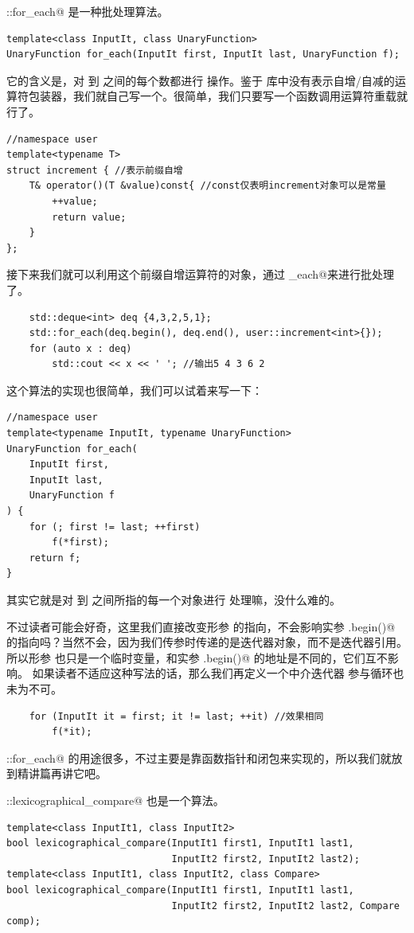 \lstinline@std::for_each@ 是一种批处理算法。
\begin{lstlisting}
template<class InputIt, class UnaryFunction>
UnaryFunction for_each(InputIt first, InputIt last, UnaryFunction f);
\end{lstlisting}
它的含义是，对 \lstinline@first@ 到 \lstinline@last@ 之间的每个数都进行 \lstinline@f@ 操作。鉴于 \lstinline@functional@ 库中没有表示自增/自减的运算符包装器，我们就自己写一个。很简单，我们只要写一个函数调用运算符重载就行了。
\begin{lstlisting}
//namespace user
template<typename T>
struct increment { //表示前缀自增
    T& operator()(T &value)const{ //const仅表明increment对象可以是常量
        ++value;
        return value;
    }
};
\end{lstlisting}
接下来我们就可以利用这个前缀自增运算符的对象，通过 \lstinline@for_each@来进行批处理了。
\begin{lstlisting}
    std::deque<int> deq {4,3,2,5,1};
    std::for_each(deq.begin(), deq.end(), user::increment<int>{});
    for (auto x : deq)
        std::cout << x << ' '; //输出5 4 3 6 2
\end{lstlisting}\par
这个算法的实现也很简单，我们可以试着来写一下：
\begin{lstlisting}
//namespace user
template<typename InputIt, typename UnaryFunction>
UnaryFunction for_each(
    InputIt first,
    InputIt last,
    UnaryFunction f
) {
    for (; first != last; ++first)
        f(*first);
    return f;
}
\end{lstlisting}
其实它就是对 \lstinline@first@ 到 \lstinline@last@ 之间所指的每一个对象进行 \lstinline@f@ 处理嘛，没什么难的。\par
不过读者可能会好奇，这里我们直接改变形参 \lstinline@first@ 的指向，不会影响实参 \lstinline@deq.begin()@ 的指向吗？当然不会，因为我们传参时传递的是迭代器对象，而不是迭代器引用。所以形参 \lstinline@first@ 也只是一个临时变量，和实参 \lstinline@deq.begin()@ 的地址是不同的，它们互不影响。
如果读者不适应这种写法的话，那么我们再定义一个中介迭代器 \lstinline@it@ 参与循环也未为不可。
\begin{lstlisting}
    for (InputIt it = first; it != last; ++it) //效果相同
        f(*it);
\end{lstlisting}
\lstinline@std::for_each@ 的用途很多，不过主要是靠函数指针和闭包来实现的，所以我们就放到精讲篇再讲它吧。\par
\lstinline@std::lexicographical_compare@ 也是一个算法。
\begin{lstlisting}
template<class InputIt1, class InputIt2>
bool lexicographical_compare(InputIt1 first1, InputIt1 last1,
                             InputIt2 first2, InputIt2 last2);
template<class InputIt1, class InputIt2, class Compare>
bool lexicographical_compare(InputIt1 first1, InputIt1 last1,
                             InputIt2 first2, InputIt2 last2, Compare comp);
\end{lstlisting}
